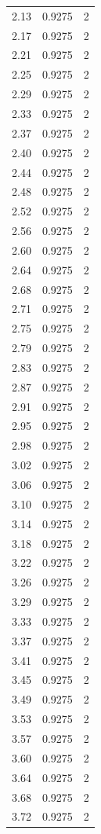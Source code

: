 \begin{longtable}{lrr}
  2.13 & 0.9275 & 2 \\
  2.17 & 0.9275 & 2 \\
  2.21 & 0.9275 & 2 \\
  2.25 & 0.9275 & 2 \\
  2.29 & 0.9275 & 2 \\
  2.33 & 0.9275 & 2 \\
  2.37 & 0.9275 & 2 \\
  2.40 & 0.9275 & 2 \\
  2.44 & 0.9275 & 2 \\
  2.48 & 0.9275 & 2 \\
  2.52 & 0.9275 & 2 \\
  2.56 & 0.9275 & 2 \\
  2.60 & 0.9275 & 2 \\
  2.64 & 0.9275 & 2 \\
  2.68 & 0.9275 & 2 \\
  2.71 & 0.9275 & 2 \\
  2.75 & 0.9275 & 2 \\
  2.79 & 0.9275 & 2 \\
  2.83 & 0.9275 & 2 \\
  2.87 & 0.9275 & 2 \\
  2.91 & 0.9275 & 2 \\
  2.95 & 0.9275 & 2 \\
  2.98 & 0.9275 & 2 \\
  3.02 & 0.9275 & 2 \\
  3.06 & 0.9275 & 2 \\
  3.10 & 0.9275 & 2 \\
  3.14 & 0.9275 & 2 \\
  3.18 & 0.9275 & 2 \\
  3.22 & 0.9275 & 2 \\
  3.26 & 0.9275 & 2 \\
  3.29 & 0.9275 & 2 \\
  3.33 & 0.9275 & 2 \\
  3.37 & 0.9275 & 2 \\
  3.41 & 0.9275 & 2 \\
  3.45 & 0.9275 & 2 \\
  3.49 & 0.9275 & 2 \\
  3.53 & 0.9275 & 2 \\
  3.57 & 0.9275 & 2 \\
  3.60 & 0.9275 & 2 \\
  3.64 & 0.9275 & 2 \\
  3.68 & 0.9275 & 2 \\
  3.72 & 0.9275 & 2 \\

\end{longtable}
